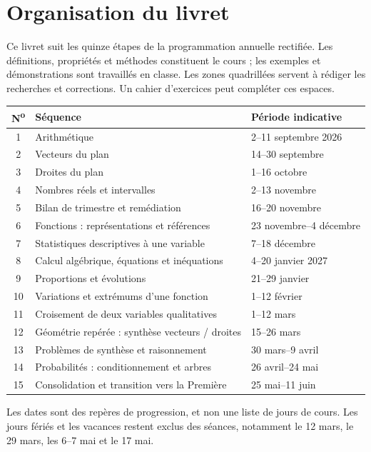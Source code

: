 \section*{Organisation du livret}
Ce livret suit les quinze étapes de la programmation annuelle rectifiée. Les définitions, propriétés et méthodes constituent le cours ; les exemples et démonstrations sont travaillés en classe. Les zones quadrillées servent à rédiger les recherches et corrections. Un cahier d'exercices peut compléter ces espaces.
\begin{center}\small{}\begin{tabularx}{\linewidth}{c X l}
\textbf{N\textsuperscript{o}}&\textbf{Séquence}&\textbf{Période indicative}\\\hline
1&Arithmétique&2--11 septembre 2026\\
2&Vecteurs du plan&14--30 septembre\\
3&Droites du plan&1--16 octobre\\
4&Nombres réels et intervalles&2--13 novembre\\
5&Bilan de trimestre et remédiation&16--20 novembre\\
6&Fonctions : représentations et références&23 novembre--4 décembre\\
7&Statistiques descriptives à une variable&7--18 décembre\\
8&Calcul algébrique, équations et inéquations&4--20 janvier 2027\\
9&Proportions et évolutions&21--29 janvier\\
10&Variations et extrémums d'une fonction&1--12 février\\
11&Croisement de deux variables qualitatives&1--12 mars\\
12&Géométrie repérée : synthèse vecteurs / droites&15--26 mars\\
13&Problèmes de synthèse et raisonnement&30 mars--9 avril\\
14&Probabilités : conditionnement et arbres&26 avril--24 mai\\
15&Consolidation et transition vers la Première&25 mai--11 juin\\\hline
\end{tabularx}\end{center}
Les dates sont des repères de progression, et non une liste de jours de cours. Les jours fériés et les vacances restent exclus des séances, notamment le 12 mars, le 29 mars, les 6--7 mai et le 17 mai.
